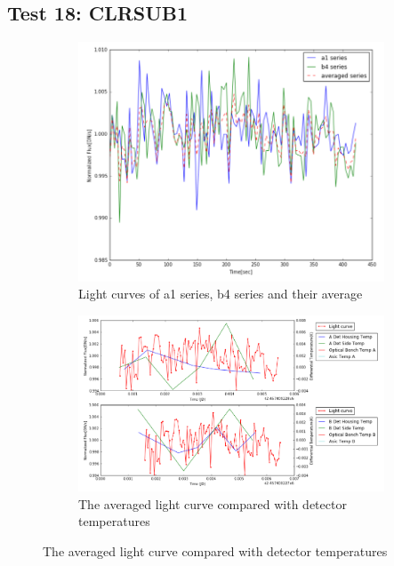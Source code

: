 \documentclass[conference]{IEEEtran}
\begin{document}
\subsection{Test 18: CLRSUB1} 
\begin{figure}[H]
    \centering
    \begin{subfigure}{1}
        \includegraphics[scale=0.4]{ts_test18}
        \caption{Light curves of a1 series, b4 series and their average}
    \end{subfigure}

    \begin{subfigure}{2}
        \includegraphics[scale=0.4]{temp_test18}
        \caption{The averaged light curve compared with detector temperatures}
    \end{subfigure}
   

\end{figure}
\end{document}
